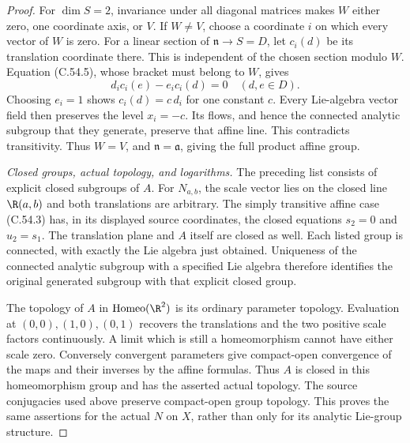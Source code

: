\begin{proof}
For $\dim S=2$, invariance under all diagonal
matrices makes $W$ either zero, one coordinate
axis, or $V$. If $W\ne V$, choose a coordinate
$i$ on which every vector of $W$ is zero.
For a linear section of
$\mathfrak n\to S=D$, let $c_i(d)$ be its
translation coordinate there. This is
independent of the chosen section modulo $W$.
Equation (C.54.5), whose bracket must belong
to $W$, gives
\[
                  d_i c_i(e)-e_i c_i(d)=0
                                  \quad(d,e\in D).
                                                               \tag{C.54.8}
\]
Choosing $e_i=1$ shows
$c_i(d)=c\,d_i$ for one constant $c$.
Every Lie-algebra vector field then preserves
the level $x_i=-c$. Its flows, and hence the
connected analytic subgroup that they
generate, preserve that affine line.
This contradicts transitivity.
Thus $W=V$, and $\mathfrak n=\mathfrak a$,
giving the full product affine group.

\emph{Closed groups, actual topology, and logarithms.}
The preceding list consists of explicit closed
subgroups of $A$. For $N_{a,b}$, the scale
vector lies on the closed line
$\R(a,b)$ and both translations are arbitrary.
The simply transitive affine case (C.54.3)
has, in its displayed source coordinates,
the closed equations $s_2=0$ and $u_2=s_1$.
The translation plane and $A$ itself are
closed as well.
Each listed group is connected, with exactly
the Lie algebra just obtained. Uniqueness
of the connected analytic subgroup with a
specified Lie algebra therefore identifies
the original generated subgroup with that
explicit closed group.

The topology of $A$ in $\operatorname{Homeo}(\R^2)$
is its ordinary parameter topology.
Evaluation at $(0,0),(1,0),(0,1)$ recovers
the translations and the two positive scale
factors continuously. A limit which is
still a homeomorphism cannot have either
scale zero. Conversely convergent parameters
give compact-open convergence of the maps
and their inverses by the affine formulas.
Thus $A$ is closed in this homeomorphism
group and has the asserted actual topology.
The source conjugacies used above preserve
compact-open group topology. This proves
the same assertions for the actual $N$ on
$X$, rather than only for its analytic
Lie-group structure.


\end{proof}
